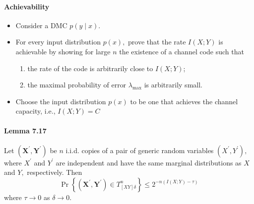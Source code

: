 \documentclass[8pt]{article}
\begin{document}
\paragraph{Achievability}
\begin{itemize}
\item Consider a DMC $p(y \mid x)$.
\item For every input distribution $p(x),$ prove that the rate $I(X ; Y)$ is achievable by showing for large $n$ the existence of a channel code such that
\begin{enumerate}
	\item the rate of the code is arbitrarily close to $I(X ; Y)$;
	\item the maximal probability of error $\lambda_{\text {max}}$ is arbitrarily small.
\end{enumerate}
\item Choose the input distribution $p(x)$ to be one that achieves the channel capacity, i.e., $I(X ; Y)=C$
\end{itemize}

\paragraph{Lemma 7.17} Let $\left(\mathbf{X}^{\prime}, \mathbf{Y}^{\prime}\right)$ be $n$ i.i.d. copies of a pair of generic random variables $\left(X^{\prime}, Y^{\prime}\right),$ where $X^{\prime}$ and $Y^{\prime}$ are independent and have the same marginal distributions as $X$ and $Y,$ respectively. Then
$$
\operatorname{Pr}\left\{\left(\mathbf{X}^{\prime}, \mathbf{Y}^{\prime}\right) \in T_{[X Y] \delta}^{n}\right\} \leq 2^{-n(I(X ; Y)-\tau)}
$$
where $\tau \rightarrow 0$ as $\delta \rightarrow 0$.\\
\end{document}
